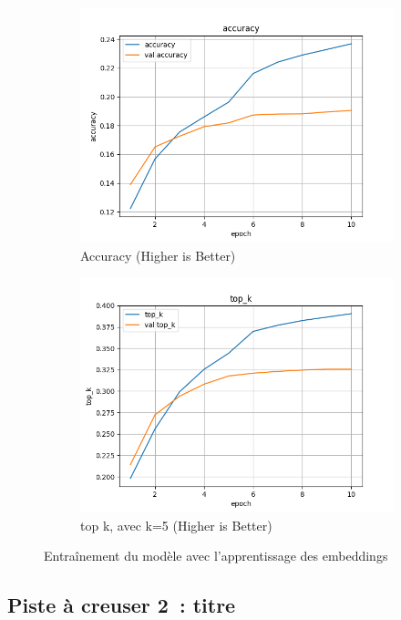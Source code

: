 \documentclass[a4paper]{article}
\begin{document}
\begin{figure}[ht]
  \begin{subfigure}{0.47\textwidth}
    \includegraphics[width=\linewidth]{../logs/learnfromscratch/accuracy.png}
    \caption{Accuracy (Higher is Better)}
  \end{subfigure}
  \hfill
  \begin{subfigure}{0.47\textwidth}
    \includegraphics[width=\linewidth]{../logs/learnfromscratch/top_k.png}
    \caption{top k, avec k=5 (Higher is Better)}
  \end{subfigure}
  \caption{Entraînement du modèle avec l'apprentissage des embeddings}
  \label{subfig:result model 2}
\end{figure}


\subsection{Piste à creuser 2~: titre}
\end{document}
